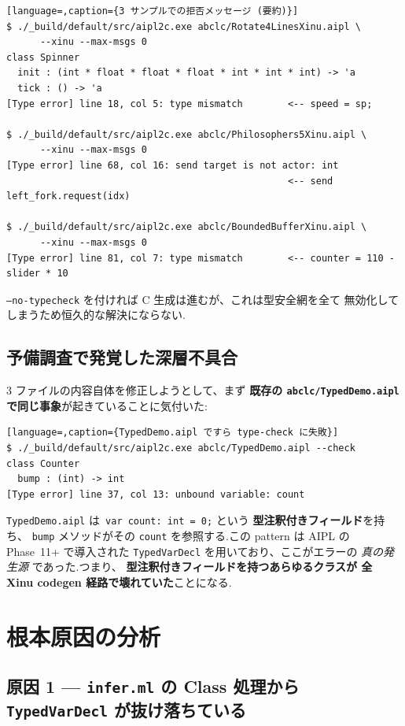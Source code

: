 \documentclass[11pt,a4paper]{article}
\begin{document}
\begin{lstlisting}[language=,caption={3 サンプルでの拒否メッセージ (要約)}]
$ ./_build/default/src/aipl2c.exe abclc/Rotate4LinesXinu.aipl \
      --xinu --max-msgs 0
class Spinner
  init : (int * float * float * float * int * int * int) -> 'a
  tick : () -> 'a
[Type error] line 18, col 5: type mismatch        <-- speed = sp;

$ ./_build/default/src/aipl2c.exe abclc/Philosophers5Xinu.aipl \
      --xinu --max-msgs 0
[Type error] line 68, col 16: send target is not actor: int
                                                  <-- send left_fork.request(idx)

$ ./_build/default/src/aipl2c.exe abclc/BoundedBufferXinu.aipl \
      --xinu --max-msgs 0
[Type error] line 81, col 7: type mismatch        <-- counter = 110 - slider * 10
\end{lstlisting}

\texttt{--no-typecheck} を付ければ C 生成は進むが、これは型安全網を全て
無効化してしまうため恒久的な解決にならない.

\subsection{予備調査で発覚した深層不具合}

3 ファイルの内容自体を修正しようとして、まず\textbf{ 既存の
\texttt{abclc/TypedDemo.aipl} で同じ事象}が起きていることに気付いた:

\begin{lstlisting}[language=,caption={TypedDemo.aipl ですら type-check に失敗}]
$ ./_build/default/src/aipl2c.exe abclc/TypedDemo.aipl --check
class Counter
  bump : (int) -> int
[Type error] line 37, col 13: unbound variable: count
\end{lstlisting}

\texttt{TypedDemo.aipl} は\texttt{ var count: int = 0;} という\textbf{
型注釈付きフィールド}を持ち、 \texttt{bump} メソッドがその \texttt{count}
を参照する.この pattern は AIPL の Phase~11+ で導入された
\texttt{TypedVarDecl} を用いており、ここがエラーの \emph{真の発生源}
であった.つまり、\textbf{ 型注釈付きフィールドを持つあらゆるクラスが
全 Xinu codegen 経路で壊れていた}ことになる.

\section{根本原因の分析}

\subsection{原因 1 — \texttt{infer.ml} の Class 処理から
\texttt{TypedVarDecl} が抜け落ちている}
\end{document}
